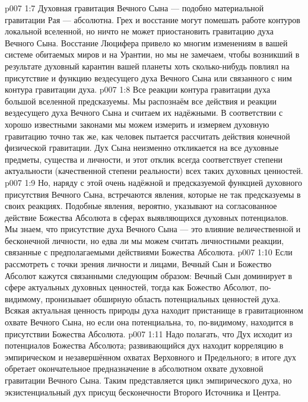 \vs p007 1:7 \pc Духовная гравитация Вечного Сына --- подобно материальной гравитации Рая --- абсолютна. Грех и восстание могут помешать работе контуров локальной вселенной, но ничто не может приостановить гравитацию духа Вечного Сына. Восстание Люцифера привело ко многим изменениям в вашей системе обитаемых миров и на Урантии, но мы не замечаем, чтобы возникший в результате духовный карантин вашей планеты хоть сколько\hyp{}нибудь повлиял на присутствие и функцию вездесущего духа Вечного Сына или связанного с ним контура гравитации духа.
\vs p007 1:8 \pc Все реакции контура гравитации духа большой вселенной предсказуемы. Мы распознаём все действия и реакции вездесущего духа Вечного Сына и считаем их надёжными. В соответствии с хорошо известными законами мы можем измерить и измеряем духовную гравитацию точно так же, как человек пытается рассчитать действия конечной физической гравитации. Дух Сына неизменно откликается на все духовные предметы, существа и личности, и этот отклик всегда соответствует степени актуальности (качественной степени реальности) всех таких духовных ценностей.
\vs p007 1:9 Но, наряду с этой очень надёжной и предсказуемой функцией духовного присутствия Вечного Сына, встречаются явления, которые не так предсказуемы в своих реакциях. Подобные явления, вероятно, указывают на согласованное действие Божества Абсолюта в сферах выявляющихся духовных потенциалов. Мы знаем, что присутствие духа Вечного Сына --- это влияние величественной и бесконечной личности, но едва ли мы можем считать личностными реакции, связанные с предполагаемыми действиями Божества Абсолюта.
\vs p007 1:10 \pc Если рассмотреть с точки зрения личности и лицами, Вечный Сын и Божество Абсолют кажутся связанными следующим образом: Вечный Сын доминирует в сфере актуальных духовных ценностей, тогда как Божество Абсолют, по\hyp{}видимому, пронизывает обширную область потенциальных ценностей духа. Всякая актуальная ценность природы духа находит пристанище в гравитационном охвате Вечного Сына, но если она потенциальна, то, по\hyp{}видимому, находится в присутствии Божества Абсолюта.
\vs p007 1:11 Надо полагать, что Дух исходит из потенциалов Божества Абсолюта; развивающийся дух находит корреляцию в эмпирическом и незавершённом охватах Верховного и Предельного; в итоге дух обретает окончательное предназначение в абсолютном охвате духовной гравитации Вечного Сына. Таким представляется цикл эмпирического духа, но экзистенциальный дух присущ бесконечности Второго Источника и Центра.
